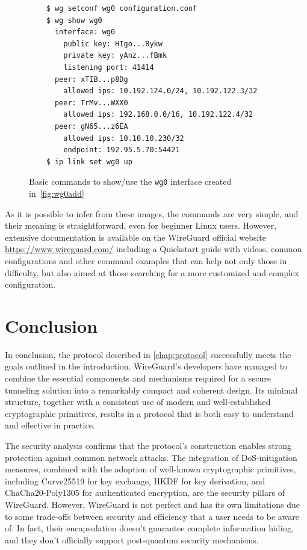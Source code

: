 \documentclass[light]{academica}
\begin{document}
\begin{figure}[H]
  \begin{verbatim}
    $ wg setconf wg0 configuration.conf
    $ wg show wg0
      interface: wg0
        public key: HIgo...8ykw
        private key: yAnz...fBmk
        listening port: 41414
      peer: xTIB...p8Dg
        allowed ips: 10.192.124.0/24, 10.192.122.3/32
      peer: TrMv...WXX0
        allowed ips: 192.168.0.0/16, 10.192.122.4/32
      peer: gN65...z6EA
        allowed ips: 10.10.10.230/32
        endpoint: 192.95.5.70:54421
    $ ip link set wg0 up
  \end{verbatim}
  \caption{Basic commands to show/use the \texttt{wg0} interface created in~\autoref{fig:wg0add}}
  \label{fig:wg0conf}
\end{figure}


As it is possible to infer from these images, the commands are very simple, and their meaning is straightforward, even for beginner Linux users.
However, extensive documentation is available on the WireGuard official website \url{https://www.wireguard.com/} including a Quickstart guide with videos, common configurations and other command examples that can help not only those in difficulty, but also aimed at those searching for a more customized and complex configuration.

\chapter{Conclusion}\label{chap:conclusion}

In conclusion, the protocol described in \autoref{chap:protocol} successfully meets the goals outlined in the introduction.
WireGuard’s developers have managed to combine the essential components and mechanisms required for a secure tunneling solution into a remarkably compact and coherent design.
Its minimal structure, together with a consistent use of modern and well-established cryptographic primitives, results in a protocol that is both easy to understand and effective in practice.

The security analysis confirms that the protocol’s construction enables strong protection against common network attacks.
The integration of DoS-mitigation measures, combined with the adoption of well-known cryptographic primitives, including Curve25519 for key exchange, HKDF for key derivation, and ChaCha20-Poly1305 for authenticated encryption, are the security pillars of WireGuard.
However, WireGuard is not perfect and has its own limitations due to some trade-offs between security and efficiency that a user needs to be aware of.
In fact, their encapsulation doesn't guarantee complete information hiding, and they don't officially support post-quantum security mechanisms.
\end{document}
